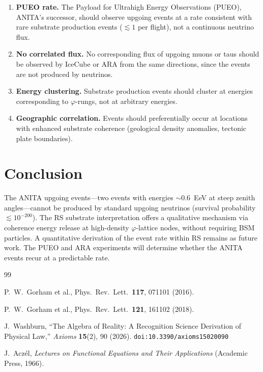 \documentclass[12pt,a4paper]{article}
\theoremstyle{definition}
\theoremstyle{remark}
\begin{document}
\begin{enumerate}
  \item \textbf{PUEO rate.}  The Payload for Ultrahigh Energy
  Observations (PUEO), ANITA's successor, should observe upgoing
  events at a rate consistent with rare substrate production events
  ($\lesssim 1$ per flight), not a continuous neutrino flux.

  \item \textbf{No correlated flux.}  No corresponding flux of upgoing
  muons or taus should be observed by IceCube or ARA from the same
  directions, since the events are not produced by neutrinos.

  \item \textbf{Energy clustering.}  Substrate production events
  should cluster at energies corresponding to $\varphi$-rungs, not at
  arbitrary energies.

  \item \textbf{Geographic correlation.}  Events should preferentially
  occur at locations with enhanced substrate coherence (geological
  density anomalies, tectonic plate boundaries).
\end{enumerate}

\section{Conclusion}
\label{sec:conclusion}

The ANITA upgoing events---two events with energies $\sim 0.6$~EeV
at steep zenith angles---cannot be produced by standard upgoing
neutrinos (survival probability $\lesssim 10^{-200}$).  The RS
substrate interpretation offers a qualitative mechanism via coherence
energy release at high-density $\varphi$-lattice nodes, without
requiring BSM particles.  A quantitative derivation of the event
rate within RS remains as future work.  The PUEO and ARA experiments
will determine whether the ANITA events recur at a predictable rate.

\begin{thebibliography}{99}

P.~W.~Gorham et al., Phys.\ Rev.\ Lett.\ \textbf{117}, 071101 (2016).

P.~W.~Gorham et al., Phys.\ Rev.\ Lett.\ \textbf{121}, 161102 (2018).

J.~Washburn, ``The Algebra of Reality: A Recognition Science Derivation
of Physical Law,'' \emph{Axioms} \textbf{15}(2), 90 (2026).
\texttt{doi:10.3390/axioms15020090}

J.~Acz\'el, \emph{Lectures on Functional Equations and Their
Applications} (Academic Press, 1966).

\end{thebibliography}
\end{document}
